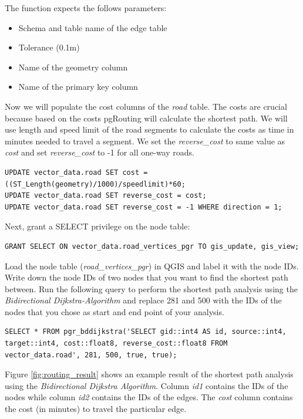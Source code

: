 \documentclass[a4paper,12pt,titlepage]{article}
\begin{document}
The function expects the follows parameters:

\begin{itemize}
	\item Schema and table name of the edge table
	\item Tolerance (0.1m)
	\item Name of the geometry column
	\item Name of the primary key column
\end{itemize}

Now we will populate the cost columns of the \textit{road} table. The costs are crucial because based on the costs pgRouting will calculate the shortest path. We will use length and speed limit of the road segments to calculate the costs as time in minutes needed to travel a segment. We set the \textit{reverse\_cost} to same value as \textit{cost} and set \textit{reverse\_cost} to -1 for all one-way roads.

\begin{lstlisting}[caption={Calculating cost values}]
UPDATE vector_data.road SET cost = ((ST_Length(geometry)/1000)/speedlimit)*60;
UPDATE vector_data.road SET reverse_cost = cost;
UPDATE vector_data.road SET reverse_cost = -1 WHERE direction = 1;
\end{lstlisting}

Next, grant a SELECT privilege on the node table:

\begin{lstlisting}[caption={Granting SELECT on node table}]
GRANT SELECT ON vector_data.road_vertices_pgr TO gis_update, gis_view;
\end{lstlisting}

Load the node table (\textit{road\_vertices\_pgr}) in QGIS and label it with the node IDs. Write down the node IDs of two nodes that you want to find the shortest path between. Run the following query to perform the shortest path analysis using the \textit{Bidirectional Dijkstra-Algorithm} and replace 281 and 500 with the IDs of the nodes that you chose as start and end point of your analysis.

\begin{lstlisting}[caption={Shortest path analysis with bddijkstra}]
SELECT * FROM pgr_bddijkstra('SELECT gid::int4 AS id, source::int4, target::int4, cost::float8, reverse_cost::float8 FROM vector_data.road', 281, 500, true, true);
\end{lstlisting}

Figure \ref{fig:routing_result} shows an example result of the shortest path analysis using the \textit{Bidirectional Dijkstra Algorithm}. Column \textit{id1} contains the IDs of the nodes while column \textit{id2} contains the IDs of the edges. The \textit{cost} column contains the cost (in minutes) to travel the particular edge.
\end{document}
